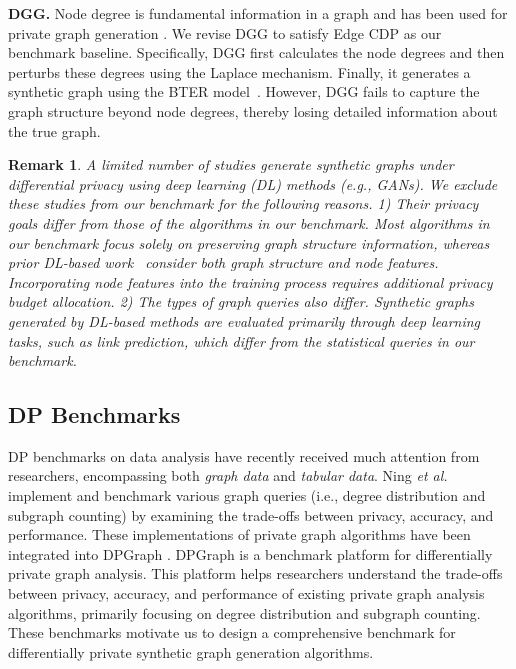 \documentclass[conference]{IEEEtran}
\theoremstyle{plain}
\newtheorem{remark}{Remark}
\begin{document}
\textbf{DGG.}
Node degree is fundamental information in a graph and has been used for private graph generation \cite{qin2017generating,ye2020lf}. 
We revise DGG \cite{qin2017generating} to satisfy Edge CDP as our benchmark baseline. 
Specifically, DGG first calculates the node degrees and then perturbs these degrees using the Laplace mechanism. 
Finally, it generates a synthetic graph using the BTER model~\cite{seshadhri2012community}. 
However, DGG fails to capture the graph structure beyond node degrees, thereby losing detailed information about the true graph.


\begin{remark} 
A limited number of studies \cite{hou2023wdp,yang2020secure} generate synthetic graphs under differential privacy using deep learning (DL) methods (e.g., GANs). 
We exclude these studies from our benchmark for the following reasons.
1) Their privacy goals differ from those of the algorithms in our benchmark. 
Most algorithms in our benchmark focus solely on preserving graph structure information, whereas prior DL-based work~\cite{hou2023wdp,yang2020secure} consider both graph structure and node features. 
Incorporating node features into the training process requires additional privacy budget allocation.
2) The types of graph queries also differ. 
Synthetic graphs generated by DL-based methods are evaluated primarily through deep learning tasks, such as link prediction, which differ from the statistical queries in our benchmark.
\end{remark}

\subsection{DP Benchmarks}
DP benchmarks on data analysis have recently received much attention from researchers, encompassing both \textit{graph data} and \textit{tabular data}.
Ning \textit{et al.} \cite{ning2021benchmarking} implement and benchmark various graph queries (i.e., degree distribution and subgraph counting) by examining the trade-offs between privacy, accuracy, and performance.
These implementations of private graph algorithms have been integrated into DPGraph \cite{xia2021dpgraph}.
DPGraph is a benchmark platform for differentially private graph analysis.
This platform helps researchers understand the trade-offs between privacy, accuracy, and performance of existing private graph analysis algorithms, primarily focusing on degree distribution and subgraph counting.
These benchmarks motivate us to design a comprehensive benchmark for differentially private synthetic graph generation algorithms.
\end{document}
